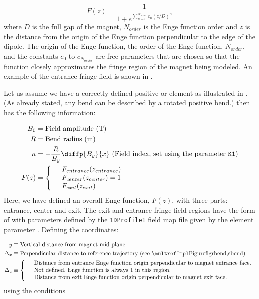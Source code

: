 \begin{equation}\label{eq:enge_func}
  F(z) = \frac{1}{1 + e^{\sum\limits_{n=0}^{N_{order}} c_{n} (z/D)^{n}}}
\end{equation}
where $D$ is the full gap of the magnet, $N_{order}$ is the Enge function order and $z$ is the distance from the origin
of the Enge function perpendicular to the edge of the dipole. The origin of the Enge function, the order of the Enge function, $N_{order}$, and the constants $c_0$ to $c_{N_{order}}$ are free parameters that are chosen so that the function closely approximates the fringe region of the magnet being modeled. An example of the entrance fringe field is shown in .

Let us assume we have a correctly defined positive  or  element as illustrated in . (As already stated, any bend can be described by a rotated positive bend.) \opalt then has the following information:

\begin{align*}
B_0 &= \text{Field amplitude (T)} \\
R &= \text{Bend radius (m)} \\
n &= -\frac{R}{B_{y}}\diffp{B_y}{x} \text{ (Field index, set using the parameter \keyword{K1})} \\
F(z) &= \left\{
\begin{array}{lll}
	& F_{entrance}(z_{entrance}) \\
	& F_{center}(z_{center}) = 1 \\
	& F_{exit}(z_{exit})
\end{array}
\right.
\end{align*}
Here, we have defined an overall Enge function, $F(z)$, with three parts: entrance, center and exit. The exit and entrance fringe field regions have the form of  with parameters defined by the \texttt{1DProfile1} field map file given by the element parameter . Defining the coordinates:

\begin{align*}
y &\equiv \text{Vertical distance from magnet mid-plane} \\
\Delta_x &\equiv \text{Perpendicular distance to reference trajectory (see \figref{rbend,sbend})} \\
\Delta_z &\equiv \left\{
\begin{array}{lll}
	& \text{Distance from entrance Enge function origin perpendicular to magnet entrance face.} \\
	& \text{Not defined, Enge function is always 1 in this region.} \\
	& \text{Distance from exit Enge function origin perpendicular to magnet exit face.}
\end{array}
\right.
\end{align*}
using the conditions

